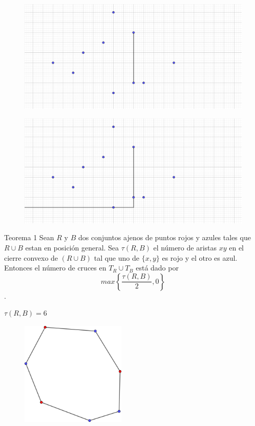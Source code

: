 \documentclass{beamer}
\begin{document}
\begin{frame}
\begin{figure}[h]
\includegraphics[width=\textwidth]{Prueba-misma-vertical-2}
\end{figure}
\end{frame}
\begin{frame}
\begin{figure}[h]
\includegraphics[width=\textwidth]{Prueba-misma-vertical-3}
\end{figure}
\end{frame}
\begin{frame}
\begin{block}{Teorema 1}
Sean $R$ y $B$ dos conjuntos ajenos de puntos rojos y azules tales que $R\cup B$ estan en posición general. Sea $\tau\left( R, B \right)$ el número de aristas $xy$ en el cierre convexo de $(R\cup B)$ tal que uno de $\lbrace x,y \rbrace$ es rojo y el otro es azul. Entonces el número de cruces en $T_{R} \cup T_{B}$ está dado por $$max\left\lbrace \frac{\tau(R, B)}{2}, 0 \right\rbrace$$.
\end{block}
\end{frame}
\begin{frame}
$\tau(R,B)= 6$
\begin{figure}[h]
\includegraphics[width=5cm, height=5cm]{tauDeRyB}
\end{figure}
\end{frame}
\end{document}
